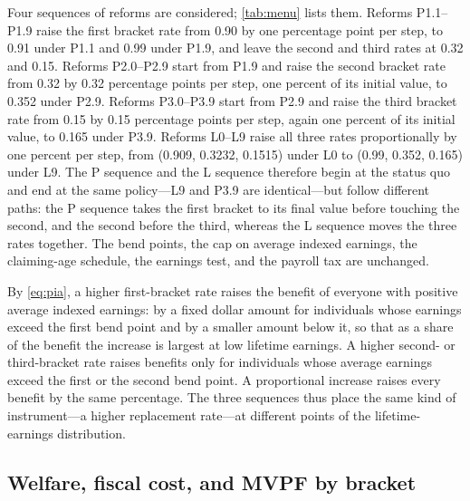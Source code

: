 Four sequences of reforms are considered; \autoref{tab:menu} lists them. Reforms P1.1--P1.9 raise the first bracket rate from 0.90 by one percentage point per step, to 0.91 under P1.1 and 0.99 under P1.9, and leave the second and third rates at 0.32 and 0.15. %
Reforms P2.0--P2.9 start from P1.9 and raise the second bracket rate from 0.32 by 0.32 percentage points per step, one percent of its initial value, to 0.352 under P2.9. %
Reforms P3.0--P3.9 start from P2.9 and raise the third bracket rate from 0.15 by 0.15 percentage points per step, again one percent of its initial value, to 0.165 under P3.9. %
Reforms L0--L9 raise all three rates proportionally by one percent per step, from (0.909, 0.3232, 0.1515) under L0 to (0.99, 0.352, 0.165) under L9. %
The P sequence and the L sequence therefore begin at the status quo and end at the same policy---L9 and P3.9 are identical---but follow different paths: the P sequence takes the first bracket to its final value before touching the second, and the second before the third, whereas the L sequence moves the three rates together. %
The bend points, the cap on average indexed earnings, the claiming-age schedule, the earnings test, and the payroll tax are unchanged.

By \eqref{eq:pia}, a higher first-bracket rate raises the benefit of everyone with positive average indexed earnings: by a fixed dollar amount for individuals whose earnings exceed the first bend point and by a smaller amount below it, so that as a share of the benefit the increase is largest at low lifetime earnings. A higher second- or third-bracket rate raises benefits only for individuals whose average earnings exceed the first or the second bend point. A proportional increase raises every benefit by the same percentage. The three sequences thus place the same kind of instrument---a higher replacement rate---at different points of the lifetime-earnings distribution.



\subsection{Welfare, fiscal cost, and MVPF by bracket}\label{subsec:pmvpf}

